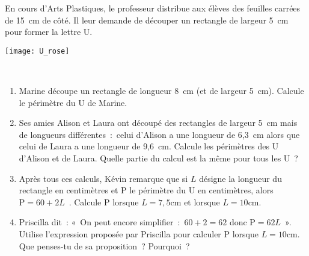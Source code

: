 \begin{exercice}
 \begin{minipage}[c]{0.58\linewidth}
 En cours d'Arts Plastiques, le professeur distribue aux élèves des feuilles carrées de 15 cm de côté. Il leur demande de découper un rectangle de largeur 5 cm pour former la lettre U. 
  \end{minipage} \hfill%
  \begin{minipage}[c]{0.38\linewidth}
  \texttt{[image: U\_rose]}
  \end{minipage} \\
\begin{enumerate}
 \item Marine découpe un rectangle de longueur 8 cm (et de largeur 5 cm). Calcule le périmètre du U de Marine.
 \item Ses amies Alison et Laura ont découpé des rectangles de largeur 5 cm mais de longueurs différentes : celui d'Alison a une longueur de 6,3 cm alors que celui de Laura a une longueur de 9,6 cm. Calcule les périmètres des U d'Alison et de Laura. Quelle partie du calcul est la même pour tous les U ? 
 \item Après tous ces calculs, Kévin remarque que si $L$ désigne la longueur du rectangle en centimètres et P le périmètre du U en centimètres, alors $\text{P} = 60 + 2L$ . Calcule P lorsque $L = 7,5 \text{cm}$ et lorsque $L = 10 \text{cm}$.
 \item Priscilla dit : « On peut encore simplifier : $60 + 2 = 62$ donc $\text{P} = 62 L$ ». Utilise l'expression proposée par Priscilla pour calculer P lorsque $L = 10 \text{cm}$. Que penses-tu de sa proposition ? Pourquoi ?
 \end{enumerate}
\end{exercice}


